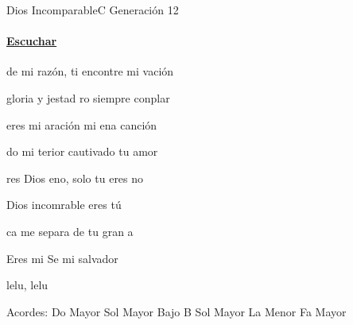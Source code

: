\documentclass[12pt, spanish]{book}
\newcommand{\NotCCLIed}{\relax}
\begin{document}
    \begin{song}{Dios Incomparable}{C}
    {} %
    {Generación 12}
    {} %
    {} %
        \ifChordBk
            \paragraph{\mbox{}\hfill\protect\href{https://open.spotify.com/intl-es/track/5zTXKukEkW61syADjVW9L7}{Escuchar}\mbox{}\hfill}
        \fi

        \begin{SBOpGroup}
             de mi razón,  ti encontre mi vación

             gloria y jestad ro siempre conplar

             eres mi aración  mi ena canción

            do mi terior  cautivado  tu amor
        \end{SBOpGroup}

        \begin{SBChorus}
            res Dios eno, solo tu eres no

            Dios incomrable eres tú

            ca me separa de tu gran a

            Eres mi Se mi salvador
        \end{SBChorus}

        \begin{SBOpGroup}
            lelu,     lelu
        \end{SBOpGroup}

        \ifChordBk
        \begin{SBOpGroup}
            Acordes:\break
            \upchord{\C}\qquad Do Mayor \hfill
            \upchord{\GB}Sol Mayor Bajo B \hfill\null\break
            \upchord{\G}\qquad Sol Mayor \hfill
            \upchord{\Am}\qquad La Menor \hfill
            \upchord{\F}\qquad Fa Mayor \hfill\null\break
        \end{SBOpGroup}
        \fi
    \end{song}
\end{document}
